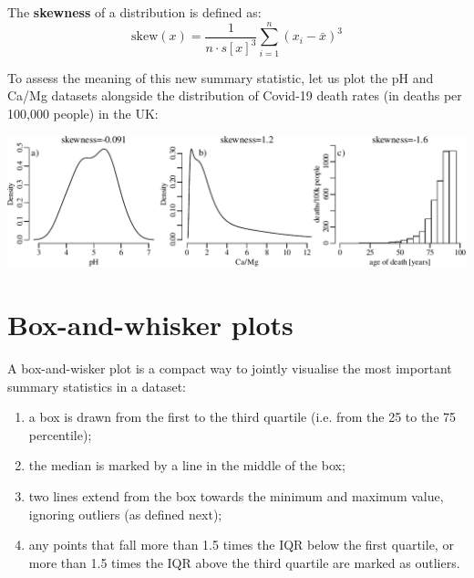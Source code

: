 The \textbf{skewness} of a distribution is defined as:
\begin{equation}
  \mbox{skew}(x) = \frac{1}{n \cdot s[x]^3}\sum\limits_{i=1}^{n}(x_i-\bar{x})^3
  \label{eq:skew}
\end{equation}

To assess the meaning of this new summary statistic, let us plot the
pH and Ca/Mg datasets alongside the distribution of Covid-19 death
rates (in deaths per 100,000 people) in the UK:\medskip

\noindent\includegraphics[]{../figures/skewness.pdf}
\begingroup {} \endgroup

\section{Box-and-whisker plots}
\label{sec:boxplots}

A box-and-wisker plot is a compact way to jointly visualise the most
important summary statistics in a dataset:

\begin{enumerate}
\item a box is drawn from the first to the third quartile (i.e. from
  the 25 to the 75 percentile);
\item the median is marked by a line in the middle of the box;
\item two lines extend from the box towards the minimum and maximum
  value, ignoring outliers (as defined next);
\item any points that fall more than 1.5 times the IQR below the first
  quartile, or more than 1.5 times the IQR above the third quartile
  are marked as outliers.
\end{enumerate}

